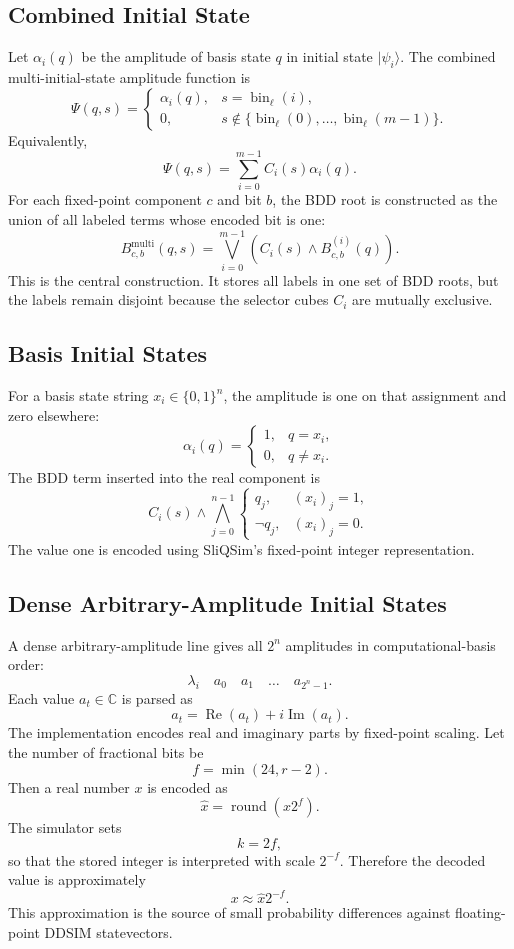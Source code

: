\documentclass[sigconf,nonacm]{acmart}
\begin{document}
\subsection{Combined Initial State}
Let $\alpha_i(q)$ be the amplitude of basis state $q$ in initial state $\lvert\psi_i\rangle$. The combined multi-initial-state amplitude function is
\[
  \Psi(q,s)=
  \begin{cases}
    \alpha_i(q), & s=\operatorname{bin}_{\ell}(i),\\
    0, & s \notin \{\operatorname{bin}_{\ell}(0),\ldots,\operatorname{bin}_{\ell}(m-1)\}.
  \end{cases}
\]
Equivalently,
\[
  \Psi(q,s)=
  \sum_{i=0}^{m-1} C_i(s)\alpha_i(q).
\]
For each fixed-point component $c$ and bit $b$, the BDD root is constructed as the union of all labeled terms whose encoded bit is one:
\[
  B^{\mathrm{multi}}_{c,b}(q,s)
  =
  \bigvee_{i=0}^{m-1}
  \left(C_i(s)\wedge B^{(i)}_{c,b}(q)\right).
\]
This is the central construction. It stores all labels in one set of BDD roots, but the labels remain disjoint because the selector cubes $C_i$ are mutually exclusive.

\subsection{Basis Initial States}
For a basis state string $x_i\in\{0,1\}^n$, the amplitude is one on that assignment and zero elsewhere:
\[
  \alpha_i(q)=
  \begin{cases}
    1, & q=x_i,\\
    0, & q\ne x_i.
  \end{cases}
\]
The BDD term inserted into the real component is
\[
  C_i(s)\wedge
  \bigwedge_{j=0}^{n-1}
  \begin{cases}
    q_j, & (x_i)_j=1,\\
    \neg q_j, & (x_i)_j=0.
  \end{cases}
\]
The value one is encoded using SliQSim's fixed-point integer representation.

\subsection{Dense Arbitrary-Amplitude Initial States}
A dense arbitrary-amplitude line gives all $2^n$ amplitudes in computational-basis order:
\[
  \lambda_i\quad a_0\quad a_1\quad \ldots\quad a_{2^n-1}.
\]
Each value $a_t\in\mathbb{C}$ is parsed as
\[
  a_t=\operatorname{Re}(a_t)+i\operatorname{Im}(a_t).
\]
The implementation encodes real and imaginary parts by fixed-point scaling. Let the number of fractional bits be
\[
  f=\min(24,r-2).
\]
Then a real number $x$ is encoded as
\[
  \widehat{x}=\operatorname{round}(x2^f).
\]
The simulator sets
\[
  k=2f,
\]
so that the stored integer is interpreted with scale $2^{-f}$. Therefore the decoded value is approximately
\[
  x\approx \widehat{x}2^{-f}.
\]
This approximation is the source of small probability differences against floating-point DDSIM statevectors.
\end{document}
